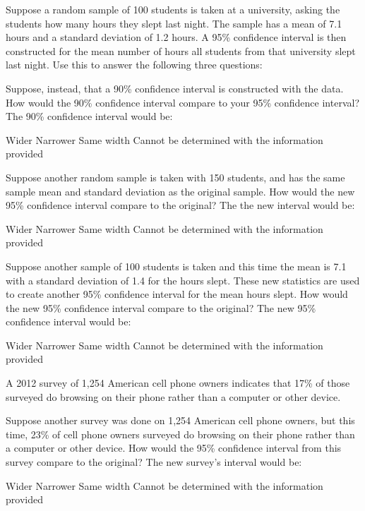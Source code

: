 \documentclass{article}
\begin{document}
\begin{mcquestions}
		\begin{mcquestioninstruction}
			Suppose a random sample of 100 students is taken at a university, asking the students how many hours they slept last night. The sample has a mean of 7.1 hours and a standard deviation of 1.2 hours. A 95\% confidence interval is then constructed for the mean number of hours all students from that university slept last night.  Use this to answer the following three questions:
		\end{mcquestioninstruction}
		\question Suppose, instead, that a 90\% confidence interval is constructed with the data. How would the 90\% confidence interval compare to your 95\% confidence interval?  The 90\% confidence interval would be:
		\begin{mcanswerslist}
			\answer  Wider
			\answer[correct] Narrower
			\answer Same width
			\answer Cannot be determined with the information provided
		\end{mcanswerslist}
		
		\question[follow] Suppose another random sample is taken with 150 students, and has the same sample mean and standard deviation as the original sample. How would the new 95\% confidence interval compare to the original? The the new interval would be:
		\begin{mcanswerslist}
			\answer  Wider
			\answer[correct] Narrower
			\answer Same width
			\answer Cannot be determined with the information provided
		\end{mcanswerslist}
		
		\question[follow] Suppose another sample of 100 students is taken and this time the mean is 7.1 with a standard deviation of 1.4 for the hours slept. These new statistics are used to create another 95\% confidence interval for the mean hours slept. How would the new 95\% confidence interval compare to the original? The new 95\% confidence interval would be:
		\begin{mcanswerslist}
			\answer[correct]  Wider
			\answer Narrower
			\answer Same width
			\answer Cannot be determined with the information provided
		\end{mcanswerslist}
		
		\question A 2012 survey of 1,254 American cell phone owners indicates that 17\% of those surveyed do browsing on their phone rather than a computer or other device.
		
		Suppose another survey was done on 1,254 American cell phone owners, but this time, 23\% of cell phone owners surveyed do browsing on their phone rather than a computer or other device.  How would the 95\% confidence interval from this survey compare to the original? The new survey's interval would be:
		\begin{mcanswerslist}
			\answer[correct]  Wider
			\answer Narrower
			\answer Same width
			\answer Cannot be determined with the information provided
		\end{mcanswerslist}
		

\end{mcquestions}
\end{document}
